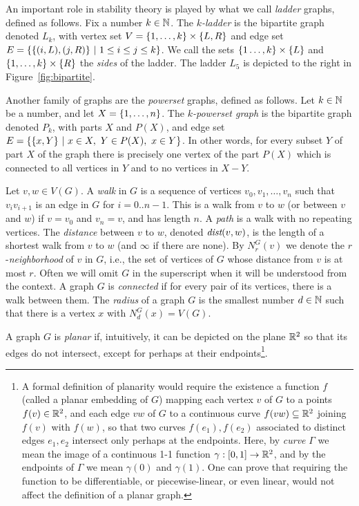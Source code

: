 \begin{example}
	An important role in stability theory is played by what we call \emph{ladder} graphs, defined as follows.
	Fix a number $k\in\mathbb{N}$. The \emph{$k$-ladder} is 
	the bipartite graph denoted $L_k$, with vertex set $V=\{1,\ldots,k\}\times \{L,R\}$ and edge set $E=\{\{(i,L),(j,R)\}\ |\ 
	1\le i\le j\le k\}$. We call the sets $\{1\ldots,k\}\times \{L\}$ and $\{1,\ldots,k\}\times \{R\}$ the \emph{sides} of the ladder.
  The ladder $L_5$ is depicted to the right in Figure~\ref{fig:bipartite}.	
\end{example}

\begin{example}
  Another family of graphs are the \emph{powerset} graphs,
  defined as follows.
  Let $k\in\mathbb{N}$ be a number, and let $X=\{1,\ldots,n\}$.
  The \emph{$k$-powerset graph} is the bipartite graph denoted $P_k$, with parts $X$ and $P(X)$, 
  and edge set $E=\setof{\set{x,Y}}{x\in X,\ Y\in P(X),\ x\in Y}$. In other words, for every subset $Y$ of part $X$ of the graph there is precisely one vertex of the part $P(X)$
  which is connected to all vertices in $Y$ and to no vertices in $X-Y$.
\end{example}



Let $v,w\in V(G)$.
A \emph{walk} in $G$ is a sequence of vertices $v_0,v_1,\ldots,v_n$
such that  $v_iv_{i+1}$ is an edge in $G$ for $i=0..n-1$. This is a walk
from  $v$ to $w$ (or between $v$ and $w$) if $v=v_0$ and $v_n=v$, and has length $n$.
A \emph{path} is a walk with no repeating vertices.
The \emph{distance} between $v$ to $w$, denoted $\textit{dist}(v,w)$, is the length of a shortest walk from $v$ to $w$ (and $\infty$ if there are none). By $N_r^G(v)$ we denote the 
$r$-\emph{neighborhood} of $v$ in $G$, i.e., the
set of vertices of $G$ 
whose distance from $v$ is at most $r$. Often we will omit $G$ in the superscript when it will be understood from the context.
A graph $G$ is \emph{connected} if for every pair of its vertices, there is a walk between them.
The \emph{radius} of a graph $G$ is the smallest number $d\in\mathbb{N}$ such that there is a vertex $x$ with $N^G_d(x)=V(G)$.
 
A graph $G$ is \emph{planar} if, intuitively, it can be depicted on the plane $\mathbb{R}^2$ so that its edges do not intersect, except for perhaps 
at their endpoints\footnote{\label{ft:planar}A formal definition of planarity would require the existence a 
function $f$ (called a planar embedding of $G$) mapping each vertex  $v$ of $G$ to a points $f(v)\in\mathbb{R}^2$, and each 
edge $vw$ of $G$
to a continuous curve  $f(vw)\subseteq\mathbb{R}^2$ joining $f(v)$ with $f(w)$, so 
that two curves $f(e_1),f(e_2)$ associated to distinct 
edges $e_1,e_2$ intersect only perhaps at the endpoints. Here, by \emph{curve} $\Gamma$ we mean
 the image  of a continuous 1-1 function $\gamma:[0,1]\to\mathbb{R}^2$,
 and by the endpoints of $\Gamma$ we mean $\gamma(0)$ and $\gamma(1)$.
 One can prove that requiring the function to be 
 differentiable, or piecewise-linear, or even linear, would not affect the definition of a planar graph.}.


